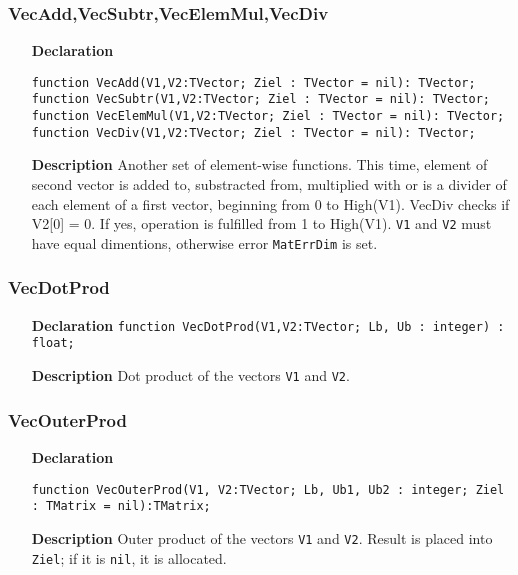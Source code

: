 \documentclass[12pt,a4paper,oneside]{report}
\newcommand{\declarationitem}[1]{\textbf{#1}}
\newcommand{\descriptiontitle}[1]{\textbf{#1}}
\newcommand{\code}[1]{\texttt{#1}}
\begin{document}
\subsubsection{VecAdd,VecSubtr,VecElemMul,VecDiv}
\label{VecAdd}
\begin{itemize}
	\item[\declarationitem{Declaration}\hfill]
	\begin{flushleft}
	\code{function VecAdd(V1,V2:TVector; Ziel : TVector = nil): TVector;}\\
	\code{function VecSubtr(V1,V2:TVector; Ziel : TVector = nil): TVector;}\\
	\code{function VecElemMul(V1,V2:TVector; Ziel : TVector = nil): TVector;}\\
	\code{function VecDiv(V1,V2:TVector; Ziel : TVector = nil): TVector;}
	\end{flushleft}
	\item[\descriptiontitle{Description}]
	Another set of element-wise functions. This time, element of second vector is added to, substracted from, multiplied with or is a divider of each element of a first vector, beginning from 0 to High(V1). VecDiv checks if V2[0] = 0. If yes, operation is fulfilled from 1 to High(V1).
	\code{V1} and \code{V2} must have equal dimentions, otherwise error \code{MatErrDim} is set.
\end{itemize} 
\subsubsection{VecDotProd}
\label{VecDotProd}
\begin{itemize}
	\item[\declarationitem{Declaration}\hfill]
	\code{function VecDotProd(V1,V2:TVector; Lb, Ub : integer) : float;}
	\item[\descriptiontitle{Description}]Dot product of the vectors \code{V1} and \code{V2}.
\end{itemize}
\subsubsection{VecOuterProd}
\label{VecOuterProd}
\begin{itemize}
	\item[\declarationitem{Declaration}\hfill]
	\begin{flushleft}
	\code{function VecOuterProd(V1, V2:TVector; Lb, Ub1, Ub2 : integer; Ziel : TMatrix = nil):TMatrix;}
	\end{flushleft}
	\item[\descriptiontitle{Description}]Outer product of the vectors \code{V1} and \code{V2}. Result is placed into \code{Ziel}; if it is \code{nil}, it is allocated. 
\end{itemize}
\end{document}
